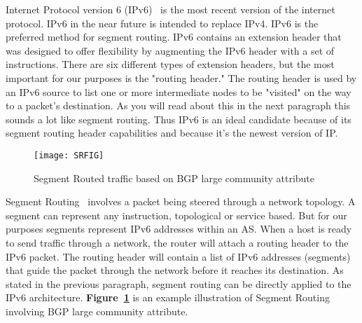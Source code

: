 Internet Protocol version 6 (IPv6)~\cite{ipv6} is the most recent version of the internet protocol. IPv6 
in the near future is intended to replace IPv4. IPv6 is the preferred method for segment routing. IPv6
contains an extension header that was designed to offer flexibility by augmenting the IPv6 header with 
a set of instructions. There are six different types of extension headers, but the most important for our
purposes is the "routing header." The routing header is used by an IPv6 source to list one or more
intermediate nodes to be "visited" on the way to a packet's destination. As you will read about this in the 
next paragraph this sounds a lot like segment routing. Thus IPv6 is an ideal candidate because of its 
segment routing header capabilities and because it's the newest version of IP.

\begin{figure}
  \centering
  \texttt{[image: SRFIG]}
  \caption{Segment Routed traffic based on BGP large community attribute}
  \label{fig:example2}
\end{figure}
Segment Routing~\cite{SRINFO} involves a packet being steered through a network topology. A segment can represent
any instruction, topological or service based. But for our purposes segments represent IPv6 addresses
within an AS. When a host is ready to send traffic through a network, the router will attach a routing header
to the IPv6 packet. The routing header will contain a list of IPv6 addresses (segments) that guide the packet
through the network before it reaches its destination. As stated in the previous paragraph, segment routing 
can be directly applied to the IPv6 architecture. \textbf{Figure~\ref{fig:example2}} is an example illustration 
of Segment Routing involving BGP large community attribute.








